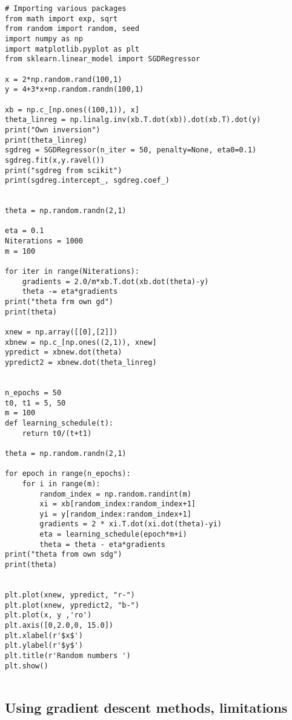 \documentclass[%
oneside,                 %
final,                   %
10pt]{article}
\begin{document}
\begin{verbatim}
# Importing various packages
from math import exp, sqrt
from random import random, seed
import numpy as np
import matplotlib.pyplot as plt
from sklearn.linear_model import SGDRegressor

x = 2*np.random.rand(100,1)
y = 4+3*x+np.random.randn(100,1)

xb = np.c_[np.ones((100,1)), x]
theta_linreg = np.linalg.inv(xb.T.dot(xb)).dot(xb.T).dot(y)
print("Own inversion")
print(theta_linreg)
sgdreg = SGDRegressor(n_iter = 50, penalty=None, eta0=0.1)
sgdreg.fit(x,y.ravel())
print("sgdreg from scikit")
print(sgdreg.intercept_, sgdreg.coef_)


theta = np.random.randn(2,1)

eta = 0.1
Niterations = 1000
m = 100

for iter in range(Niterations):
    gradients = 2.0/m*xb.T.dot(xb.dot(theta)-y)
    theta -= eta*gradients
print("theta frm own gd")
print(theta)

xnew = np.array([[0],[2]])
xbnew = np.c_[np.ones((2,1)), xnew]
ypredict = xbnew.dot(theta)
ypredict2 = xbnew.dot(theta_linreg)


n_epochs = 50
t0, t1 = 5, 50
m = 100
def learning_schedule(t):
    return t0/(t+t1)

theta = np.random.randn(2,1)

for epoch in range(n_epochs):
    for i in range(m):
        random_index = np.random.randint(m)
        xi = xb[random_index:random_index+1]
        yi = y[random_index:random_index+1]
        gradients = 2 * xi.T.dot(xi.dot(theta)-yi)
        eta = learning_schedule(epoch*m+i)
        theta = theta - eta*gradients
print("theta from own sdg")
print(theta)


plt.plot(xnew, ypredict, "r-")
plt.plot(xnew, ypredict2, "b-")
plt.plot(x, y ,'ro')
plt.axis([0,2.0,0, 15.0])
plt.xlabel(r'$x$')
plt.ylabel(r'$y$')
plt.title(r'Random numbers ')
plt.show()


\end{verbatim}


\subsection*{Using gradient descent methods, limitations}
\end{document}
